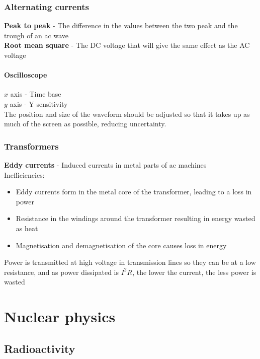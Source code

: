 \documentclass[12pt]{article}
\begin{document}
\subsubsection{Alternating currents}
\textbf{Peak to peak} - The difference in the values between the two peak and the trough of an ac wave\\
\textbf{Root mean square} - The DC voltage that will give the same effect as the AC voltage
\paragraph{Oscilloscope}
$x$ axis - Time base\\
$y$ axis - Y sensitivity\\
The position and size of the waveform should be adjusted so that it takes up as much of the screen as possible, reducing uncertainty.
\subsubsection{Transformers}
\textbf{Eddy currents} - Induced currents in metal parts of ac machines\\
Inefficiencies:
\begin{itemize}
\item Eddy currents form in the metal core of the transformer, leading to a loss in power
\item Resistance in the windings around the transformer resulting in energy wasted as heat
\item Magnetisation and demagnetisation of the core causes loss in energy
\end{itemize}
Power is transmitted at high voltage in transmission lines so they can be at a low resistance, and as power dissipated is $I^2R$, the lower the current, the less power is wasted
\section{Nuclear physics}
\subsection{Radioactivity}
\end{document}
